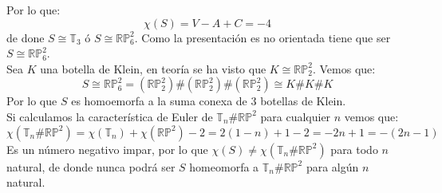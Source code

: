 \documentclass[12pt]{article}
\begin{document}
\begin{ejercicio}
\begin{figure}[H]
        \end{figure}
        \noindent
        Por lo que:
        \begin{equation*}
            \chi(S) = V-A+C = -4
        \end{equation*}
        de done $S\cong \mathbb{T}_3$ ó $S\cong \mathbb{R}\mathbb{P}^2_6$. Como la presentación es no orientada tiene que ser $S\cong \mathbb{R}\mathbb{P}^2_6$.\\

        \noindent
        Sea $K$ una botella de Klein, en teoría se ha visto que $K\cong \mathbb{R}\mathbb{P}^2_2$. Vemos que:
        \begin{equation*}
            S\cong \mathbb{R}\mathbb{P}^2_6 = (\mathbb{R}\mathbb{P}^2_2) \# (\mathbb{R}\mathbb{P}^2_2) \# (\mathbb{R}\mathbb{P}^2_2) \cong K\# K\# K
        \end{equation*}
        Por lo que $S$ es homoemorfa a la suma conexa de 3 botellas de Klein.\\

        \noindent
        Si calculamos la característica de Euler de $\mathbb{T}_n\# \mathbb{R}\mathbb{P}^2$ para cualquier $n$ vemos que:
        \begin{equation*}
            \chi(\mathbb{T}_n\# \mathbb{R}\mathbb{P}^2) = \chi(\mathbb{T}_n) + \chi(\mathbb{R}\mathbb{P}^2) -2 = 2(1-n) + 1 - 2 = -2n+1 = -(2n-1)
        \end{equation*}
        Es un número negativo impar, por lo que $\chi(S)\neq \chi(\mathbb{T}_n\# \mathbb{R}\mathbb{P}^2)$ para todo $n$ natural, de donde nunca podrá ser $S$ homeomorfa a $\mathbb{T}_n\# \mathbb{R}\mathbb{P}^2$ para algún $n$ natural.
    \end{ejercicio}
\end{document}
